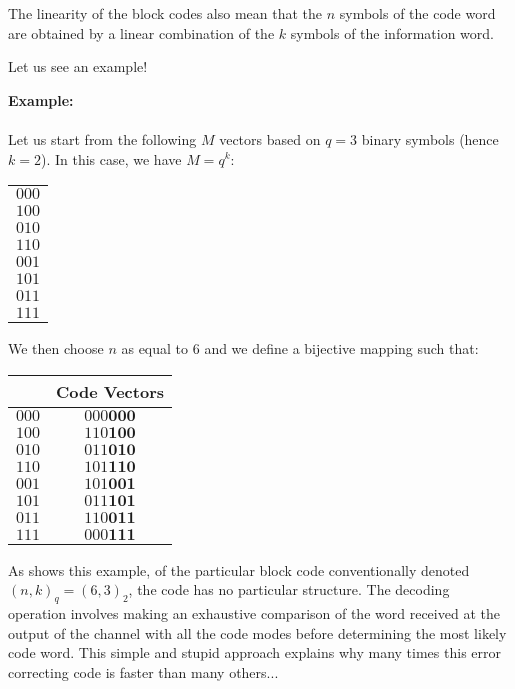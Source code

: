 	\begin{tcolorbox}[title=Remark,colframe=black,arc=10pt]
	The linearity of the block codes also mean that the $n$ symbols of the code word are obtained by a linear combination of the $k$ symbols of the information word.
	\end{tcolorbox}
	Let us see an example!
	\begin{tcolorbox}[colframe=black,colback=white,sharp corners]
	\textbf{{\Large {}}Example:}\\\\
	Let us start from the following $M$ vectors based on $q = 3$ binary symbols (hence $k = 2$). In this case, we have $M=q^k$:
	\begin{table}[H]
		\centering
		\begin{tabular}{|c|}
		\hline
		\rowcolor[HTML]{9B9B9B} 
		\multicolumn{1}{|l|}{\cellcolor[HTML]{9B9B9B}\textbf{Vectors}} \\ \hline
		$000$ \\ \hline
		$100$ \\ \hline
		$010$ \\ \hline
		$110$ \\ \hline
		$001$ \\ \hline
		$101$ \\ \hline
		$011$ \\ \hline
		$111$ \\ \hline
		\end{tabular}
	\end{table}
	We then choose $n$ as equal to $6$ and we define a bijective mapping such that:
	\begin{table}[H]
		\centering
		\begin{tabular}{|c|c|}
		\hline
		\rowcolor[HTML]{9B9B9B} 
		\multicolumn{1}{|l|}{\cellcolor[HTML]{9B9B9B}\textbf{Vectors}} & \textbf{Code Vectors} \\ \hline
		$000$ & $000\pmb{000}$ \\ \hline
		$100$ & $110\pmb{100}$ \\ \hline
		$010$ & $011\pmb{010}$ \\ \hline
		$110$ & $101\pmb{110}$ \\ \hline
		$001$ & $101\pmb{001}$ \\ \hline
		$101$ & $011\pmb{101}$ \\ \hline
		$011$ & $110\pmb{011}$ \\ \hline
		$111$ & $000\pmb{111}$ \\ \hline
		\end{tabular}
	\end{table}
	As shows this example, of the particular block code conventionally denoted $(n, k)_q = (6, 3)_2$, the code has no particular structure. The decoding operation involves making an exhaustive comparison of the word received at the output of the channel with all the code modes before determining the most likely code word. This simple and stupid approach explains why many times this error correcting code is faster than many others...
	\end{tcolorbox}
